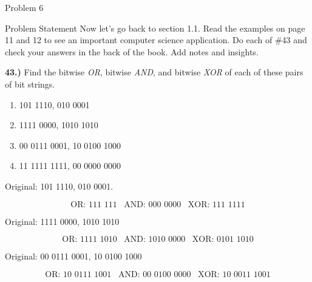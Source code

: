 \begin{problem}{Problem 6}
    \begin{statement}{Problem Statement}
        Now let’s go back to section 1.1. Read the examples on page 11 and 12 to see an important computer science application. Do each of \#43 and check your answers in the back of the book. Add notes and 
        insights. \vspace*{1em}

        \noindent \textbf{43.)} Find the bitwise \textit{OR}, bitwise \textit{AND}, and bitwise \textit{XOR} of each of these pairs of bit strings.

        \begin{enumerate}[label=(\alph*)]
            \item 101 1110, 010 0001
            \item 1111 0000, 1010 1010
            \item 00 0111 0001, 10 0100 1000
            \item 11 1111 1111, 00 0000 0000
        \end{enumerate}
    \end{statement}

    \begin{Highlight}
        Original: 101 1110, 010 0001.

        \setcounter{equation}{0}
        \begin{equation}
            \text{OR: 111 111} \hspace{10pt} \text{AND: 000 0000} \hspace{10pt} \text{XOR: 111 1111}
        \end{equation}
    \end{Highlight}

    \begin{Highlight}
        Original: 1111 0000, 1010 1010

        \begin{equation}
            \text{OR: 1111 1010} \hspace{10pt} \text{AND: 1010 0000} \hspace{10pt} \text{XOR: 0101 1010}
        \end{equation}
    \end{Highlight}

    \begin{Highlight}
        Original: 00 0111 0001, 10 0100 1000

        \begin{equation}
            \text{OR: 10 0111 1001} \hspace{10pt} \text{AND: 00 0100 0000} \hspace{10pt} \text{XOR: 10 0011 1001}
        \end{equation}
    \end{Highlight}


\end{problem}
